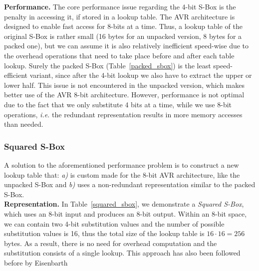 \documentclass[11pt]{llncs2e} %
\begin{document}
\textbf{Performance.} The core performance issue regarding the 4-bit S-Box is the penalty in accessing it, if stored in a lookup table. The AVR architecture is designed to enable fast access for 8-bits at a time.
Thus, a lookup table of the original S-Box is rather small (16 bytes for an unpacked version, 8 bytes for a packed one), but we can assume it is also relatively inefficient speed-wise due to the overhead operations that need to take place before and after each table lookup.
Surely the packed S-Box (Table~\ref{packed_sbox}) is the least speed-efficient variant, since after the 4-bit lookup we also have to extract the upper or lower half.
This issue is not encountered in the unpacked version, which makes better use of the AVR 8-bit architecture.
However, performance is not optimal due to the fact that we only substitute 4 bits at a time, while we use 8-bit operations, \emph{i.e.} the redundant representation results in more memory accesses than needed. 

\subsubsection{Squared S-Box}\label{ssbox}
A solution to the aforementioned performance problem is to construct a new lookup table that: \emph{a)} is custom made for the 8-bit AVR architecture, like the unpacked S-Box and \emph{b)} uses a non-redundant representation similar to the packed S-Box.\\
\textbf{Representation.} In Table~\ref{squared_sbox}, we demonstrate a \emph{Squared S-Box}, which uses an 8-bit input and produces an 8-bit output. Within an 8-bit space, we can contain two 4-bit substitution values and the number of possible substitution values is 16, thus the total size of the lookup table is $16 \cdot 16=256$ bytes. As a result, there is no need for overhead computation and the substitution consists of a single lookup. This approach has also been followed before by Eisenbarth~\cite{eisenbarth2012compact}\\
\end{document}
